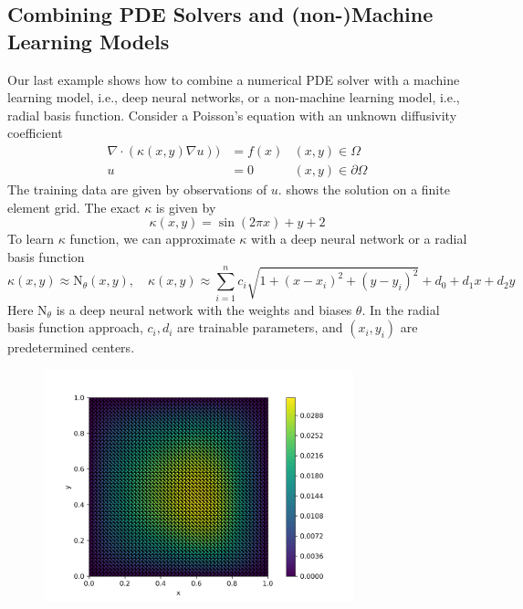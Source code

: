 \documentclass[3p,preprint,12pt]{elsarticle}
\begin{document}
\subsection{Combining PDE Solvers and (non-)Machine Learning Models}

Our last example shows how to combine a numerical PDE solver with a machine learning model, i.e., deep neural networks, or a non-machine learning model, i.e., radial basis function. Consider a Poisson's equation with an unknown diffusivity coefficient
\begin{equation}\label{equ:poisson}
\begin{aligned}
     \nabla \cdot (\kappa(x,y) \nabla u)) &= f(x) & (x,y)\in \Omega\\ 
     u &= 0 & (x,y)\in  \partial\Omega
\end{aligned}
\end{equation}
The training data are given by observations of $u$.  shows the solution on a finite element grid. The exact $\kappa$ is given by 
$$\kappa(x,y) = \sin(2\pi x) + y + 2$$
To learn $\kappa$ function, we can approximate $\kappa$ with a deep neural network or a radial basis function
$$\kappa(x,y) \approx \text{N}_\theta(x, y), \quad \kappa(x,y) \approx \sum_{i=1}^n c_i \sqrt{1+(x-x_i)^2 + (y-y_i)^2} + d_0 + d_1 x + d_2 y$$
Here $\text{N}_\theta$ is a deep neural network with the weights and biases $\theta$. In the radial basis function approach, $c_i, d_i$ are trainable parameters, and $(x_i, y_i)$ are predetermined centers.

\begin{figure}[htpb]
    \centering
    \includegraphics[width=0.8\textwidth]{figures/combine_forward.png}
    \caption{}
    \label{fig:cforward}
\end{figure}
\end{document}
